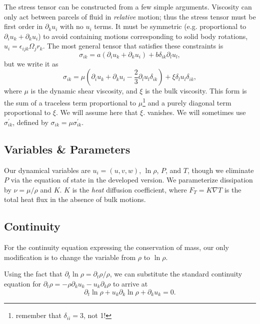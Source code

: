 \documentclass[letterpaper,12pt]{paper}
\newcommand{\lnrho}{\ensuremath{\ln \rho}}
\newcommand{\fast}{\ensuremath{\epsilon_{ijk}}}
\begin{document}
The stress tensor can be constructed from a few simple
arguments. Viscosity can only act between parcels of fluid in
\emph{relative} motion; thus the stress tensor must be first order in
$\partial_k u_i$ with no $u_i$ terms. It must be symmetric
(e.g. proportional to $\partial_i u_k + \partial_k u_i$) to avoid
containing motions corresponding to solid body rotations,
$u_i = \fast \Omega_j r_k$. The most general tensor that satisfies
these constraints is
\begin{equation}
  \label{eq:general_tensor}
  \sigma_{ik} = a (\partial_i u_k + \partial_k u_i) + b \delta_{ik} \partial_l u_l, 
\end{equation}
but we write it as 
\begin{equation}
  \label{eq:stress}
  \sigma_{ik} = \mu \left(\partial_i u_k + \partial_k u_i - \frac{2}{3} \partial_l u_l \delta_{ik}\right) + \xi \delta_l u_l \delta_{ik},
\end{equation}
where $\mu$ is the dynamic shear viscosity, and $\xi$ is the bulk
viscosity. This form is the sum of a traceless term proportional to
$\mu$\footnote{remember that $\delta_{ii} = 3$, not 1!} and a purely
diagonal term proportional to $\xi$. We will assume here that $\xi$.
vanishes. We will sometimes use $\sigma^{'}_{ik}$, defined by
$\sigma_{ik} = \mu \sigma^{'}_{ik}$.

\subsection{Variables \& Parameters}
\label{sec:variables}

Our dynamical variables are $u_i = (u,v,w)$, $\lnrho$, $P$, and $T$,
though we eliminate $P$ via the equation of state in the developed
version. We parameterize dissipation by $\nu = \mu /\rho$ and $K$. $K$
is the \emph{heat} diffusion coefficient, where
$F_T = K \nabla T$ is the total heat flux in the
absence of bulk motions.


\subsection{Continuity}
\label{sec:continuity}

For the continuity equation expressing the conservation of mass, our
only modification is to change the variable from $\rho$ to $\lnrho$.

Using the fact that $\partial_t \lnrho = \partial_t \rho/\rho$, we can
substitute the standard continuity equation for $\partial_t \rho =
-\rho \partial_k u_k - u_k \partial_k \rho$ to arrive at 
\begin{equation}
  \label{eq:lnrho_continuity}
  \partial_t \lnrho + u_k \partial_k \lnrho + \partial_k u_k = 0.
\end{equation}
\end{document}
